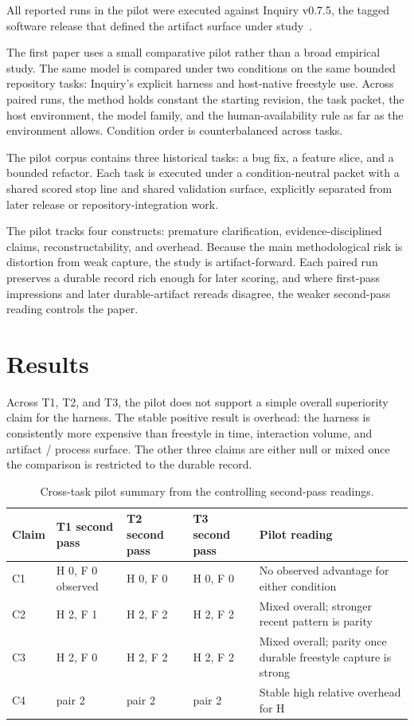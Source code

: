 \documentclass[conference]{IEEEtran}
\begin{document}
All reported runs in the pilot were executed against Inquiry v0.7.5, the tagged
software release that defined the artifact surface under study~\cite{inquiry_0_7_5}.

The first paper uses a small comparative pilot rather than a broad empirical study. The
same model is compared under two conditions on the same bounded repository tasks:
Inquiry's explicit harness and host-native freestyle use. Across paired runs, the method
holds constant the starting revision, the task packet, the host environment, the model
family, and the human-availability rule as far as the environment allows. Condition
order is counterbalanced across tasks.

The pilot corpus contains three historical tasks: a bug fix, a feature slice, and a
bounded refactor. Each task is executed under a condition-neutral packet with a shared
scored stop line and shared validation surface, explicitly separated from later release
or repository-integration work.

The pilot tracks four constructs: premature clarification, evidence-disciplined claims,
reconstructability, and overhead. Because the main methodological risk is distortion
from weak capture, the study is artifact-forward. Each paired run preserves a durable
record rich enough for later scoring, and where first-pass impressions and later
durable-artifact rereads disagree, the weaker second-pass reading controls the paper.

\section{Results}

Across T1, T2, and T3, the pilot does not support a simple overall superiority claim for
the harness. The stable positive result is overhead: the harness is consistently more
expensive than freestyle in time, interaction volume, and artifact / process surface.
The other three claims are either null or mixed once the comparison is restricted to the
durable record.

\begin{table}[t]
\centering
\caption{Cross-task pilot summary from the controlling second-pass readings.}\label{tab:pilot-summary}
\begin{tabularx}{\textwidth}{@{}l l l l X@{}}
\toprule
Claim & T1 second pass & T2 second pass & T3 second pass & Pilot reading \\
\midrule
C1 & H 0, F 0 observed & H 0, F 0 & H 0, F 0 & No observed advantage for either condition \\
C2 & H 2, F 1 & H 2, F 2 & H 2, F 2 & Mixed overall; stronger recent pattern is parity \\
C3 & H 2, F 0 & H 2, F 2 & H 2, F 2 & Mixed overall; parity once durable freestyle capture is strong \\
C4 & pair 2 & pair 2 & pair 2 & Stable high relative overhead for H \\
\bottomrule
\end{tabularx}
\end{table}
\end{document}
